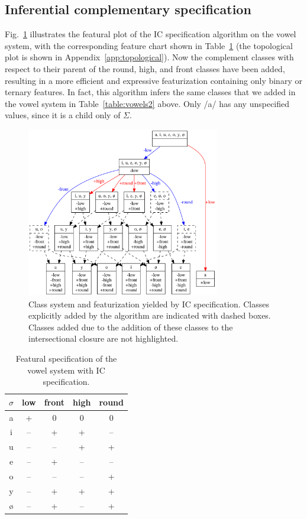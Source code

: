 \documentclass[12pt, oneside]{article}   	%
\begin{document}
\subsection{Inferential complementary specification}

Fig.~\ref{fig:vowel_inventory_ic} illustrates the featural plot of the IC specification algorithm on the vowel system, with the corresponding feature chart shown in Table~\ref{table:vowel_inventory_ic} (the topological plot is shown in Appendix~\ref{app:topological}). Now the complement classes with respect to their parent of the round, high, and front classes have been added, resulting in a more efficient and expressive featurization containing only binary or ternary features. In fact, this algorithm infers the same classes that we added in the vowel system in Table~\ref{table:vowels2} above. Only /a/ has any unspecified values, since it is a child only of $\Sigma$.

\begin{figure}[htb!]
	\centering
	\includegraphics[width=0.75\textwidth]{vowel_inventory_ic_FEATURAL.png}
	\caption{Class system and featurization yielded by IC specification. Classes explicitly added by the algorithm are indicated with dashed boxes. Classes added due to the addition of these classes to the intersectional closure are not highlighted.}
	\label{fig:vowel_inventory_ic}
\end{figure}

\begin{table}[htb!]
	\centering
	\begin{tabular} {|c||c|c|c|c|}
		\hline
		$\sigma$ & low & front & high & round \\ \hline
		a & + & 0 & 0 & 0 \\
		i & -- & + & + & -- \\
		u & -- & -- & + & + \\
		e & -- & + & -- & -- \\
		o & -- & -- & -- & + \\
		y & -- & + & + & + \\
		\o & -- & + & -- & + \\
		\hline
	\end{tabular}
	\caption{Featural specification of the vowel system with IC specification.}
	\label{table:vowel_inventory_ic}
\end{table}
\end{document}

